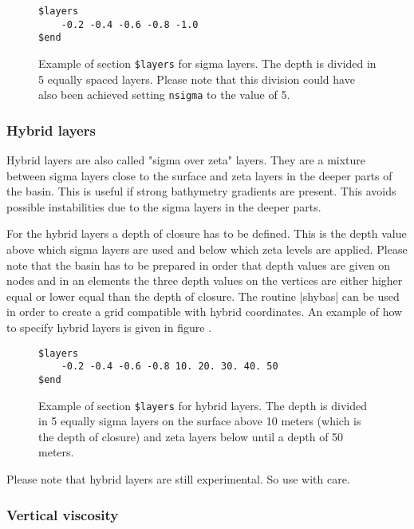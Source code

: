 \begin{figure}[ht]
\begin{verbatim}
$layers
	-0.2 -0.4 -0.6 -0.8 -1.0
$end
\end{verbatim}
\caption{Example of section {\tt \$layers} for sigma layers.
The depth is divided in 5 equally spaced layers. Please note that
this division could have also been achieved setting {\tt nsigma} to the
value of 5.}
\label{fig:slayers}
\end{figure}

\subsubsection{Hybrid layers}

Hybrid layers are also called "sigma over zeta" layers. They are a
mixture between sigma layers close to the surface and zeta layers in
the deeper parts of the basin. This is useful if strong bathymetry
gradients are present. This avoids possible instabilities due to the
sigma layers in the deeper parts.

For the hybrid layers a depth of closure has to be defined. This is the
depth value above which sigma layers are used and below which zeta levels
are applied. Please note that the basin has to be prepared in order that
depth values are given on nodes and in an elements the three depth values
on the vertices are either higher equal or lower equal than the depth
of closure. The routine |shybas| can be used in order to create
a grid compatible with hybrid coordinates. An example of how
to specify hybrid layers is given in
figure .

\begin{figure}[ht]
\begin{verbatim}
$layers
	-0.2 -0.4 -0.6 -0.8 10. 20. 30. 40. 50
$end
\end{verbatim}
\caption{Example of section {\tt \$layers} for hybrid layers.
The depth is divided in 5 equally sigma layers on the surface above 10 meters
(which is the depth of closure) and zeta layers below until a depth
of 50 meters.}
\label{fig:hlayers}
\end{figure}

Please note that hybrid layers are still experimental. So use with care.




\subsubsection{Vertical viscosity}

